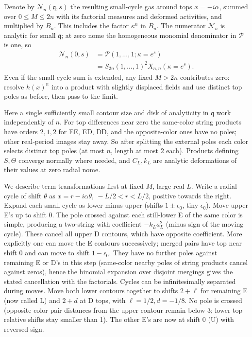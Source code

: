 Denote by \(\mathcal N_n(\mathfrak q,s)\) the resulting small-cycle gas around tops \(x=-i\alpha\), summed over \(0\le M\le2n\) with its factorial measures and deformed activities, and multiplied by \(B_n\). This includes the factor \(\kappa^n\) in \(B_n\). The numerator \(\mathcal N_n\) is analytic for small \(\mathfrak q\); at zero nome the homogeneous monomial denominator in \(\mathcal P\) is one, so
\[
 \begin{aligned}
 \mathcal N_n(0,s)&=\mathcal P(1,\ldots,1;\kappa=e^s)\\
 &=S_{2n}(1,\ldots,1)^2 X_{n,n}(\kappa=e^s).
 \end{aligned}
\]
Even if the small-cycle sum is extended, any fixed \(M>2n\) contributes zero: resolve \(h(x)^n\) into a product with slightly displaced fields and use distinct top poles as before, then pass to the limit.

Here a single sufficiently small contour size and disk of analyticity in \(\mathfrak q\) work independently of \(n\). For top differences near zero the same-color string products have orders \(2,1,2\) for EE, ED, DD, and the opposite-color ones have no poles; other real-period images stay away. So after splitting the external poles each color selects distinct top poles (at most \(n\), length at most 2 each). Products defining \(S,\Theta\) converge normally where needed, and \(C_L,k_L\) are analytic deformations of their values at zero radial nome.

We describe term transformations first at fixed \(M\), large real \(L\). Write a radial cycle of shift \(\theta\) as \(x=r-i\alpha\theta,\ -L/2<r<L/2\), positive towards the right. Expand each small cycle as lower minus upper (shifts \(1\pm\epsilon_0\), tiny \(\epsilon_0\)). Move upper E's up to shift 0. The pole crossed against each still-lower E of the same color is simple, producing a two-string with coefficient \(-k_L a_L^2\) (minus sign of the moving cycle). These cancel all upper D contours, which have opposite coefficient. More explicitly one can move the E contours successively; merged pairs have top near shift 0 and can move to shift \(1-\epsilon_0\). They have no further poles against remaining E or D's in this step (same-color nearby poles of string products cancel against zeros), hence the binomial expansion over disjoint mergings gives the stated cancellation with the factorials. Cycles can be infinitesimally separated during moves. Move both lower contours together to shifts \(2+\ell\) for remaining E (now called \(\mathrm L\)) and \(2+d\) at D tops, with \(\ell=1/2, d=-1/8\). No pole is crossed (opposite-color pair distances from the upper contour remain below 3; lower top relative shifts stay smaller than 1). The other E's are now at shift 0 (\(\mathrm U\)) with reversed sign.

